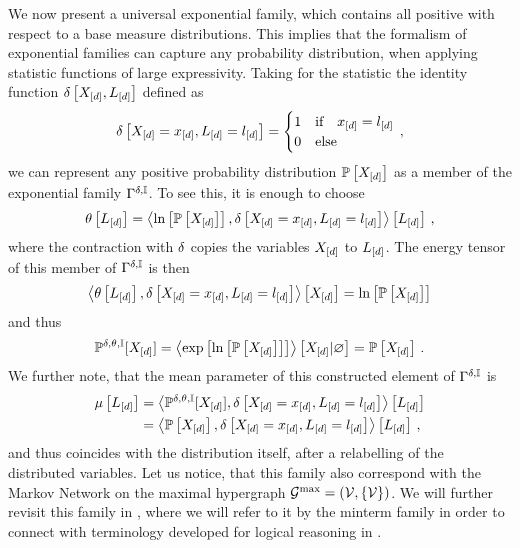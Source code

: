 We now present a universal exponential family, which contains all positive with respect to a base measure distributions.
This implies that the formalism of exponential families can capture any probability distribution, when applying statistic functions of large expressivity.
Taking for the statistic the identity function $\delta\left[X_{[d]},L_{[d]}\right]$ defined as
\begin{align*}
    \delta\left[X_{[d]}=x_{[d]},L_{[d]}=l_{[d]}\right]
    = \begin{cases}
          1 & \text{if} \quad x_{[d]} = l_{[d]} \\
          0 & \text{else}
    \end{cases} \, ,
\end{align*}
we can represent any positive probability distribution $\mathbb{P}\left[X_{[d]}\right]$ as a member of the exponential family $\Gamma^{\delta,\mathbb{I}}$.
To see this, it is enough to choose
\begin{align*}
    \theta\left[L_{[d]}\right] = \left\langle \ln \left[ \mathbb{P}\left[X_{[d]}\right] \right],\delta\left[X_{[d]}=x_{[d]},L_{[d]}=l_{[d]}\right]\right\rangle \left[ L_{[d]} \right] \, ,
\end{align*}
where the contraction with $\delta$ copies the variables $X_{[d]}$ to $L_{[d]}$.
The energy tensor of this member of $\Gamma^{\delta,\mathbb{I}}$ is then
\begin{align*}
    \left\langle \theta\left[L_{[d]}\right],\delta\left[X_{[d]}=x_{[d]},L_{[d]}=l_{[d]}\right]\right\rangle \left[ X_{[d]} \right]
    = \ln \left[ \mathbb{P}\left[X_{[d]}\right] \right]
\end{align*}
and thus
\begin{align*}
    \mathbb{P}^{\delta,\theta,\mathbb{I}}[X_{[d]}] = \left\langle \mathrm{exp}\left[\ln \left[ \mathbb{P}\left[X_{[d]}\right] \right]\right]\right\rangle \left[ X_{[d]} | \varnothing \right] = \mathbb{P}\left[X_{[d]}\right] \, .
\end{align*}
We further note, that the mean parameter of this constructed element of $\Gamma^{\delta,\mathbb{I}}$ is
\begin{align*}
    \mu\left[L_{[d]}\right]
    &= \left\langle \mathbb{P}^{\delta,\theta,\mathbb{I}}[X_{[d]}],\delta\left[X_{[d]}=x_{[d]},L_{[d]}=l_{[d]}\right]\right\rangle \left[ L_{[d]} \right]\\
    &= \left\langle \mathbb{P}\left[X_{[d]}\right],\delta\left[X_{[d]}=x_{[d]},L_{[d]}=l_{[d]}\right]\right\rangle \left[ L_{[d]} \right] \, ,
\end{align*}
and thus coincides with the distribution itself, after a relabelling of the distributed variables.
Let us notice, that this family also correspond with the Markov Network on the maximal hypergraph $\mathcal{G}^{\mathrm{max}}=(\mathcal{V},\{\mathcal{V}\})$.
We will further revisit this family in , where we will refer to it by the minterm family in order to connect with terminology developed for logical reasoning in .



